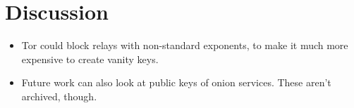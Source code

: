 \section{Discussion}
\label{sec:discussion}

\begin{itemize}
	\item Tor could block relays with non-standard exponents, to make it much
		more expensive to create vanity keys.
	\item Future work can also look at public keys of onion services.  These
		aren't archived, though.
\end{itemize}
